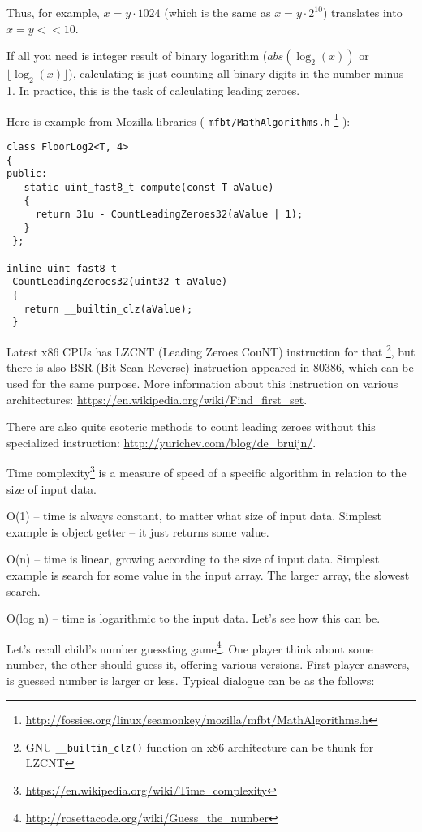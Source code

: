 Thus, for example, $x=y \cdot 1024$ (which is the same as $x=y \cdot 2^{10}$) translates into $x=y<<10$.


If all you need is integer result of binary logarithm ($abs(\log_2(x))$ or $\lfloor \log_2(x) \rfloor$), 
calculating is just counting all binary digits in the number minus 1.
In practice, this is the task of calculating leading zeroes.

Here is example from Mozilla libraries ( \texttt{mfbt/MathAlgorithms.h}
\footnote{\url{http://fossies.org/linux/seamonkey/mozilla/mfbt/MathAlgorithms.h}} ):

\begin{lstlisting}[caption=Mozilla libraries]
class FloorLog2<T, 4>
{
public:
   static uint_fast8_t compute(const T aValue)
   {
     return 31u - CountLeadingZeroes32(aValue | 1);
   }
 };

inline uint_fast8_t
 CountLeadingZeroes32(uint32_t aValue)
 {
   return __builtin_clz(aValue);
 }
\end{lstlisting}

Latest x86 CPUs has LZCNT (Leading Zeroes CouNT) instruction for that
\footnote{GNU \texttt{\_\_builtin\_clz()} function on x86 architecture can be thunk for LZCNT}, 
but there is also BSR (Bit Scan Reverse) instruction appeared in 80386, which can be used for the same purpose.
More information about this instruction on various architectures: \url{https://en.wikipedia.org/wiki/Find_first_set}.

There are also quite esoteric methods to count leading zeroes without this specialized instruction: \url{http://yurichev.com/blog/de_bruijn/}.


Time complexity\footnote{\url{https://en.wikipedia.org/wiki/Time_complexity}} is a measure of speed of a specific algorithm 
in relation to the size of input data.

O(1) -- time is always constant, to matter what size of input data. Simplest example is object getter -- it just returns some value.

O(n) -- time is linear, growing according to the size of input data. Simplest example is search for some value in the input array.
The larger array, the slowest search.

O(log n) -- time is logarithmic to the input data.
Let's see how this can be.

Let's recall child's number guessting game\footnote{\url{http://rosettacode.org/wiki/Guess_the_number}}.
One player think about some number, the other should guess it, offering various versions.
First player answers, is guessed number is larger or less.
Typical dialogue can be as the follows:

